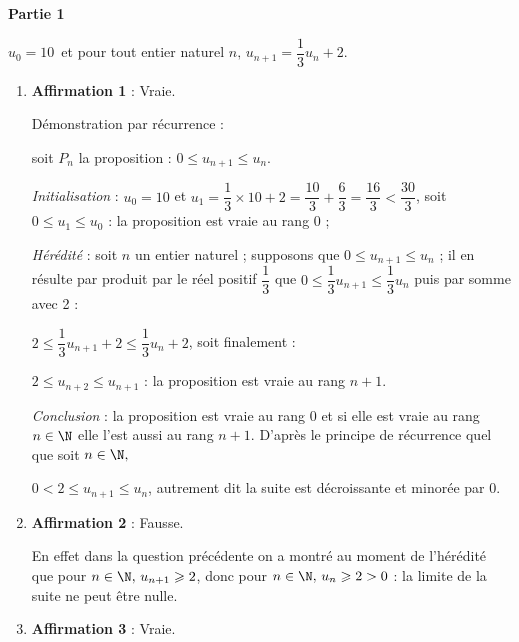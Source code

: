 
\medskip

%
%
%

\textbf{Partie 1}

\medskip


\begin{center}$u_0 = 10$\, et pour tout entier naturel $n,\,u_{n+1} = \dfrac13 u_n + 2$.\end{center}

\medskip

\begin{enumerate}
\item \textbf{Affirmation 1} : Vraie. %

Démonstration par récurrence :

soit $P_n$ la proposition : \og $0 \leqslant u_{n+1} \leqslant u_n $\fg.

\emph{Initialisation} : $u_0 = 10$ et $u_1 = \dfrac13 \times 10 + 2 = \dfrac{10}{3} + \dfrac63 = \dfrac{16}{3} < \dfrac{30}{3}$, soit $0\leqslant u_1 \leqslant u_0$ : la proposition est vraie au rang $0$ ;

\emph{Hérédité} : soit $n$ un entier naturel ; supposons que  $0\leqslant u_{n+1} \leqslant u_n$ ; il en résulte par produit par le réel positif $\dfrac13$ que \quad  $0 \leqslant \dfrac13 u_{n+1} \leqslant \dfrac13 u_n$ puis par somme avec 2 :

$2 \leqslant \dfrac13 u_{n+1} + 2 \leqslant \dfrac13 u_n + 2$, soit finalement :

$2 \leqslant u_{n+2} \leqslant u_{n+1}$ : la proposition est vraie au rang $n + 1$.

\emph{Conclusion} : la proposition est vraie au rang 0 et si elle est vraie au rang $n \in \N$ elle l'est aussi au rang $n + 1$. D'après le principe de récurrence quel que soit $n \in \N,\,$

$ 0 < 2 \leqslant u_{n+1} \leqslant u_n$, autrement dit la suite est décroissante et minorée par $0$.

\item \textbf{Affirmation 2} : Fausse.%

En effet dans la question précédente on a montré au moment de l'hérédité que pour $n \in \N, \, u_{n+1} \geqslant 2$, donc pour $n\in \N, \, u_n \geqslant 2 > 0$ : la limite de la suite ne peut être nulle.
\item \textbf{Affirmation 3} : Vraie.%


\end{enumerate}
